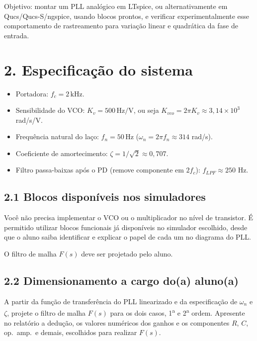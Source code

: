\documentclass[11pt,a4paper]{article}
\begin{document}
Objetivo: montar um PLL analógico em LTspice, ou alternativamente em Qucs/Qucs-S/ngspice, usando blocos
prontos, e verificar experimentalmente esse comportamento de rastreamento para variação linear
e quadrática da fase de entrada.

\section*{2. Especificação do sistema}

\begin{instrucao}
\begin{itemize}[leftmargin=1.5em]
  \item Portadora: $f_c = 2\,\mathrm{kHz}$.
  \item Sensibilidade do VCO: $K_v = 500\,\mathrm{Hz/V}$, ou seja $K_{vco}=2\pi K_v\approx 3{,}14\times 10^3$ rad/s/V.
  \item Frequência natural do laço: $f_n = 50\,\mathrm{Hz}$ ($\omega_n = 2\pi f_n \approx 314$ rad/s).
  \item Coeficiente de amortecimento: $\zeta = 1/\sqrt{2}\approx 0{,}707$.
  \item Filtro passa-baixas após o PD (remove componente em $2f_c$): $f_{LPF}\approx 250$ Hz.
\end{itemize}
\end{instrucao}

\subsection*{2.1 Blocos disponíveis nos simuladores}

Você não precisa implementar o VCO ou o multiplicador no nível de transistor. É permitido utilizar
blocos funcionais já disponíveis no simulador escolhido, desde que o aluno saiba identificar e
explicar o papel de cada um no diagrama do PLL.

O filtro de malha $F(s)$ deve ser projetado pelo aluno.

\subsection*{2.2 Dimensionamento a cargo do(a) aluno(a)}

A partir da função de transferência do PLL linearizado e da especificação de $\omega_n$ e $\zeta$,
projete o filtro de malha $F(s)$ para os dois casos, 1\textsuperscript{a} e 2\textsuperscript{a}
ordem. Apresente no relatório a dedução, os valores numéricos dos ganhos e os componentes
$R$, $C$, op.\ amp.\ e demais, escolhidos para realizar $F(s)$.
\end{document}
